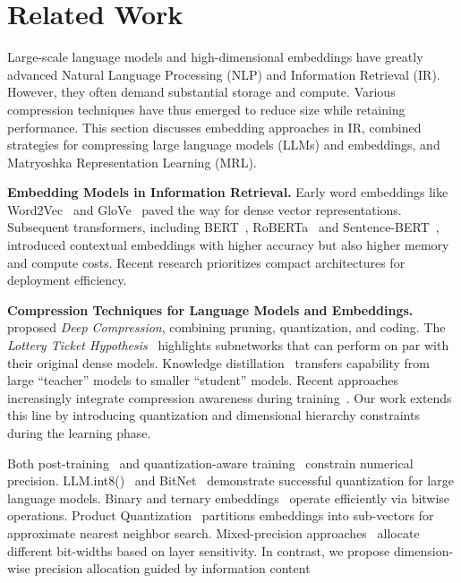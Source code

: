\section{Related Work}
\label{sec:related_work}

Large-scale language models and high-dimensional embeddings have greatly advanced Natural Language Processing (NLP) and Information Retrieval (IR). 
However, they often demand substantial storage and compute. Various compression techniques have thus emerged to reduce size while retaining performance. 
This section discusses embedding approaches in IR, combined strategies for compressing large language models (LLMs) and embeddings, and Matryoshka Representation Learning (MRL).

\textbf{Embedding Models in Information Retrieval.}
Early word embeddings like Word2Vec~\cite{mikolov2013distributed} and GloVe~\cite{pennington2014glove} paved the way for dense vector representations. Subsequent transformers, including BERT~\cite{devlin2019bert}, RoBERTa~\cite{liu2019roberta} and Sentence-BERT~\cite{reimers-2019-sentence-bert}, introduced contextual embeddings with higher accuracy but also higher memory and compute costs. 
Recent research prioritizes compact architectures for deployment efficiency.

\textbf{Compression Techniques for Language Models and Embeddings.}
\citet{han2015deep} proposed \emph{Deep Compression}, combining pruning, quantization, and coding. The \emph{Lottery Ticket Hypothesis}~\cite{frankle2019lottery} highlights subnetworks that can perform on par with their original dense models. 
Knowledge distillation~\cite{hinton2015distilling, sanh2019distilbert, jiao2020tinybert} transfers capability from large “teacher” models to smaller “student” models.
Recent approaches increasingly integrate compression awareness during training~\cite{shen2021efficient,wang-etal-2024-compression}. 
Our work extends this line by introducing quantization and dimensional hierarchy constraints during the learning phase.

Both post-training~\cite{jacob2018quantization} and quantization-aware training~\cite{hubara2017quantized,mishra2018apprentice} constrain numerical precision. LLM.int8()~\cite{dettmers2022llm} and BitNet~\cite{wang2023bitnet} demonstrate successful quantization for large language models.
Binary and ternary embeddings~\cite{shen2018nash, shu2018compressing} operate efficiently via bitwise operations. 
Product Quantization~\cite{jegou2010product} partitions embeddings into sub-vectors for approximate nearest neighbor search.
Mixed-precision approaches~\cite{dong2019hawq,wang2019haq} allocate different bit-widths based on layer sensitivity. 
In contrast, we propose dimension-wise precision allocation guided by information content

